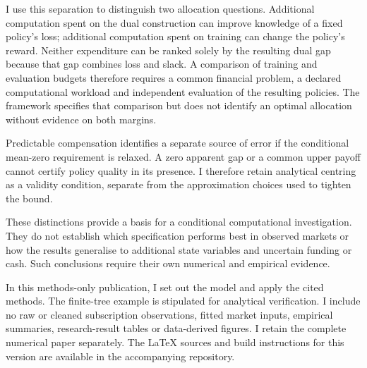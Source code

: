 I use this separation to distinguish two allocation questions. Additional computation spent on the dual construction can improve knowledge of a fixed policy's loss; additional computation spent on training can change the policy's reward. Neither expenditure can be ranked solely by the resulting dual gap because that gap combines loss and slack. A comparison of training and evaluation budgets therefore requires a common financial problem, a declared computational workload and independent evaluation of the resulting policies. The framework specifies that comparison but does not identify an optimal allocation without evidence on both margins.

Predictable compensation identifies a separate source of error if the conditional mean-zero requirement is relaxed. A zero apparent gap or a common upper payoff cannot certify policy quality in its presence. I therefore retain analytical centring as a validity condition, separate from the approximation choices used to tighten the bound.

These distinctions provide a basis for a conditional computational investigation. They do not establish which specification performs best in observed markets or how the results generalise to additional state variables and uncertain funding or cash. Such conclusions require their own numerical and empirical evidence.

In this methods-only publication, I set out the model and apply the cited methods. The finite-tree example is stipulated for analytical verification. I include no raw or cleaned subscription observations, fitted market inputs, empirical summaries, research-result tables or data-derived figures. I retain the complete numerical paper separately. The LaTeX sources and build instructions for this version are available in the accompanying repository.
